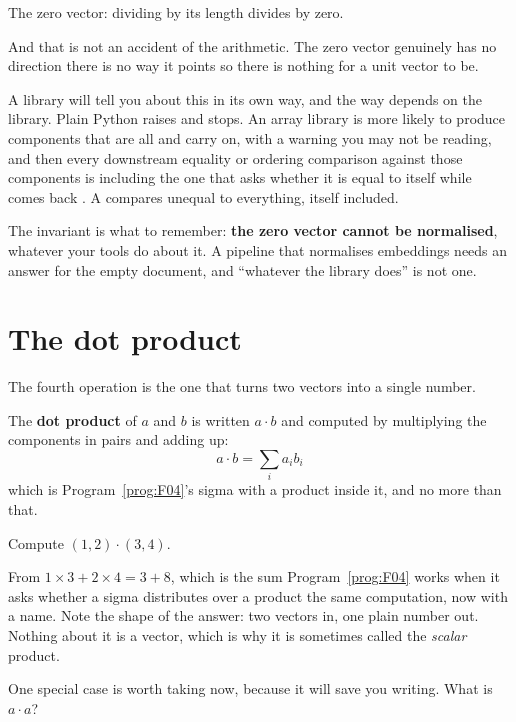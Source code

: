 \begin{fr}
\begin{ansblock}
The zero vector: dividing by its length divides by zero.
\end{ansblock}

And that is not an accident of the arithmetic. The zero vector genuinely has
no direction \dash{} there is no way it points \dash{} so there is nothing for
a unit vector to be.

\begin{warning}
A library will tell you about this in its own way, and the way depends on the
library. Plain Python raises  and stops. An array
library is more likely to produce components that are all  and carry
on, with a warning you may not be reading, and then every downstream
equality or ordering comparison against those components is 
\dash{} including the one that asks whether it is equal to itself \dash{}
while \code{!=} comes back . A  compares unequal to
everything, itself included.

The invariant is what to remember: \textbf{the zero vector cannot be
normalised}, whatever your tools do about it. A pipeline that normalises
embeddings needs an answer for the empty document, and \enquote{whatever the
library does} is not one.
\end{warning}
\end{fr}

\section{The dot product}
\label{sec:F09-dot}

\begin{fr}
The fourth operation is the one that turns two vectors into a single number.

The \textbf{dot product} of $a$ and $b$ is written $a \cdot b$ and computed by
multiplying the components in pairs and adding up:
\[ a \cdot b = \sum_i a_i b_i \]
which is Program~\ref{prog:F04}'s sigma with a product inside it, and no more
than that.

Compute $(1, 2) \cdot (3, 4)$.
\nextframe
\end{fr}

\begin{fr}
From $1 \times 3 + 2 \times 4 = 3 + 8$, which is the sum
Program~\ref{prog:F04} works when it asks whether a sigma distributes over a
product \dash{} the same computation, now with a name. Note the shape of the
answer: two vectors in, one plain number out. Nothing about it is a vector, which is why
it is sometimes called the \emph{scalar} product.

One special case is worth taking now, because it will save you writing.
What is $a \cdot a$?
\nextframe
\end{fr}


